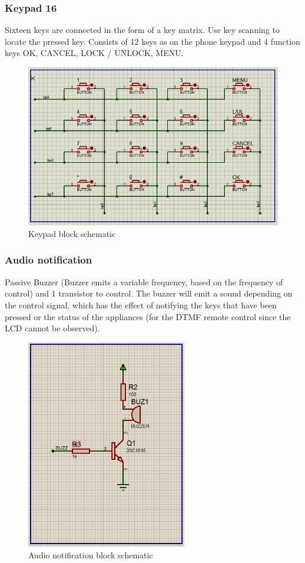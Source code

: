 \documentclass[a4paper]{article}
\begin{document}
\subsubsection{Keypad 16}
Sixteen keys are connected in the form of a key matrix. Use key scanning to locate the pressed key. Consists of 12 keys as on the phone keypad and 4 function keys OK, CANCEL, LOCK / UNLOCK, MENU.
\begin{figure}[h!]
\centering
\includegraphics[width=13cm]{images/keypad.PNG}
\caption*{Keypad block schematic}
\end{figure}
\subsubsection{Audio notification}
Passive Buzzer (Buzzer emits a variable frequency, based on the frequency of control) and 1 transistor to control. The buzzer will emit a sound depending on the control signal, which has the effect of notifying the keys that have been pressed or the status of the appliances (for the DTMF remote control since the LCD cannot be observed).
\begin{figure}[h!]
\centering
\includegraphics[width=7cm]{images/audio.PNG}
\caption*{Audio notification block schematic}
\end{figure}
\end{document}
